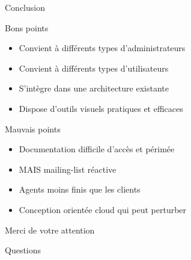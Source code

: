 \documentclass{beamer}
\begin{document}
\begin{frame}{Conclusion}
    \begin{block}{Bons points}
        \begin{itemize}
        \item Convient à différents types d'administrateurs %
        \item Convient à différents types d'utilisateurs %
        \item S'intègre dans une architecture existante
        \item Dispose d'outils visuels pratiques et efficaces
    \end{itemize}
        
    \end{block}

    \begin{alertblock}{Mauvais points}
    \begin{itemize}
        \item Documentation difficile d'accès et périmée
        \item MAIS mailing-list réactive
        \item Agents moins finis que les clients
        \item Conception orientée cloud qui peut perturber %
    \end{itemize}
        
    \end{alertblock}

\end{frame}


\begin{frame}
	\begin{center}	{\huge Merci de votre attention}\end{center}
	\end{frame}
\begin{frame}
	\begin{center}	{\huge Questions}\end{center}
	\end{frame}
\end{document}
